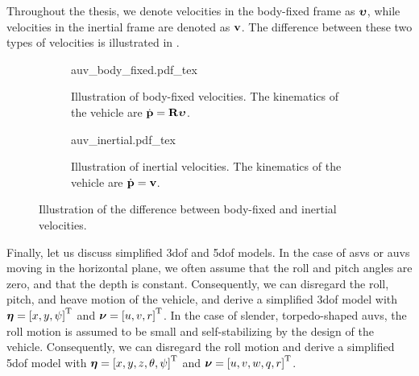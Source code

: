 Throughout the thesis, we denote velocities in the body-fixed frame as $\bm{\upsilon}$, while velocities in the inertial frame are denoted as $\mathbf{v}$.
The difference between these two types of velocities is illustrated in .

\begin{figure}[b]
    \centering
    \begin{subfigure}{0.4\textwidth}
        \centering
        \def\svgwidth{0.9\textwidth}
        {auv_body_fixed.pdf_tex}
        \caption{Illustration of body-fixed velocities. The kinematics of the vehicle are $\dot{\mathbf{p}} = \mathbf{R} \bm{\upsilon}$.}
    \end{subfigure}
    \hspace*{0.05\textwidth}
    \begin{subfigure}{0.4\textwidth}
        \centering
        \def\svgwidth{0.9\textwidth}
        {auv_inertial.pdf_tex}
        \caption{Illustration of inertial velocities. The kinematics of the vehicle are $\dot{\mathbf{p}} = \mathbf{v}$.}
    \end{subfigure}
    \caption{Illustration of the difference between body-fixed and inertial velocities.}
    \label{fig:background_body_fixed_inertial}
\end{figure}

Finally, let us discuss simplified 3\gls{dof} and 5\gls{dof} models.
In the case of \glspl{asv} or \glspl{auv} moving in the horizontal plane, we often assume that the roll and pitch angles are zero, and that the depth is constant.
Consequently, we can disregard the roll, pitch, and heave motion of the vehicle, and derive a simplified 3\gls{dof} model with $\bm{\eta} = \left[x, y, \psi\right]^{\mathrm{T}}$ and $\bm{\nu} = \left[u, v, r\right]^{\mathrm{T}}$.
In the case of slender, torpedo-shaped \glspl{auv}, the roll motion is assumed to be small and self-stabilizing by the design of the vehicle.
Consequently, we can disregard the roll motion and derive a simplified 5\gls{dof} model with $\bm{\eta} = \left[x, y, z, \theta, \psi\right]^{\mathrm{T}}$ and $\bm{\nu} = \left[u, v, w, q, r\right]^{\mathrm{T}}$.

